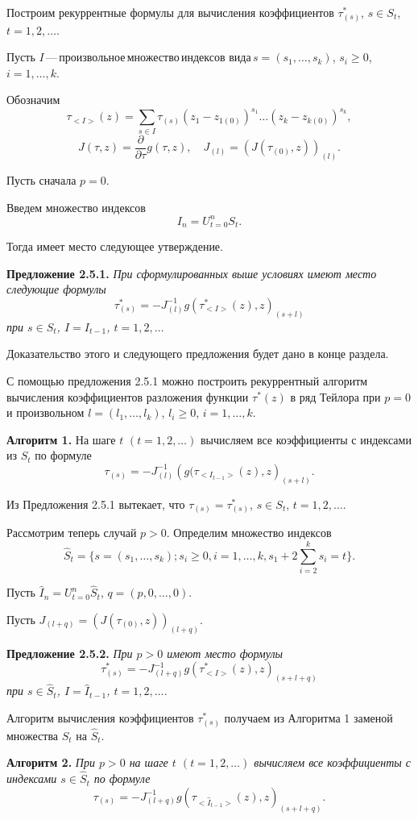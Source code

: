 Построим рекуррентные формулы для вычисления коэффициентов
$\tau^*_{(s)}$, $s\in S_t$, $t=1,2,\ldots$.

Пусть $I$\,---\,произвольное\,множество\,индексов
вида\,$s=(s_1,\ldots,s_k)$, $s_i\geq 0$, $i=1,\ldots,k$.

Обозначим
$$
\tau_{<I>}(z)=\sum_{s\in I}\tau_{(s)}(z_1-z_{1(0)})^{s_1}\ldots
(z_k- z_{k(0)})^{s_k},
$$
$$
J(\tau,z)=\frac{\partial}{\partial \tau}g(\tau,z),\quad
J_{(l)}=\left(J(\tau_{(0)},z)\right)_{(l)}.
$$

Пусть сначала $p=0$.

Введем множество индексов
$$
I_n=U^n_{t=0}S_t.
$$

Тогда имеет место следующее утверждение.

{\bf Предложение 2.5.1.} {\it При сформулированных выше условиях
имеют место следующие формулы
$$
\tau^*_{(s)}=-J^{-1}_{(l)}g(\tau^*_{<I>}(z),z)_{(s+l)}
$$
при $s\in S_t$,  $I=I_{t-1}$, $t=1,2,\ldots$ }

Доказательство этого и следующего предложения будет дано в конце
раздела.

С помощью предложения 2.5.1 можно построить рекуррентный алгоритм
вычисления коэффициентов разложения функции $\tau^*(z)$ в ряд
Тейлора при $p=0$ и произвольном $l=(l_1,\ldots,l_k)$, $l_i\geq 0$,
$i=1,\ldots,k$.

{\bf Алгоритм 1.} На шаге $t$ $(t=1,2,\ldots)$ вычисляем все
коэффициенты с индексами из $S_t$ по формуле
$$
\tau_{(s)}=-J^{-1}_{(l)}\left(g(\tau_{<I_{t-1}>}(z),z\right)_{(s+l)}.
$$

Из Предложения 2.5.1 вытекает, что $\tau_{(s)}=\tau^*_{(s)}$, $s\in
S_t$, $t=1,2,\ldots$.

Рассмотрим теперь случай $p>0$. Определим множество индексов
$$
\hat S_t=\{s=(s_1,\ldots,s_k);s_i\geq
0,i=1,\ldots,k,s_1+2\sum^k_{i=2} s_i=t\}.
$$

Пусть $\hat I_n= U^n_{t=0}\hat S_t$, $q=(p,0,\ldots,0)$.

Пусть $J_{(l+q)}=\left(J(\tau_{(0)},z)\right)_{(l+q)}$.


{\bf Предложение 2.5.2.} {\it При $p>0$ имеют место формулы
$$
\tau^*_{(s)}=-J^{-1}_{(l+q)}
g\left(\tau^*_{<I>}(z),z\right)_{(s+l+q)}
$$
при $s\in \hat S_t$, $I=\hat I_{t-1}$, $t=1,2,\ldots$. }

Алгоритм вычисления коэффициентов $\tau^*_{(s)}$ получаем из
Алгоритма 1 заменой множества $S_t$ на $\hat S_t$.


{\bf Алгоритм 2.} {\it При $p>0$ на шаге $t$ $(t=1,2,\ldots)$
вычисляем все коэффициенты с индексами $s\in\hat S_t$ по формуле
$$
\tau_{(s)}=-J^{-1}_{(l+q)} g\left(\tau_{<\hat
I_{t-1}>}(z),z\right)_{(s+l+q)}.
$$
}

